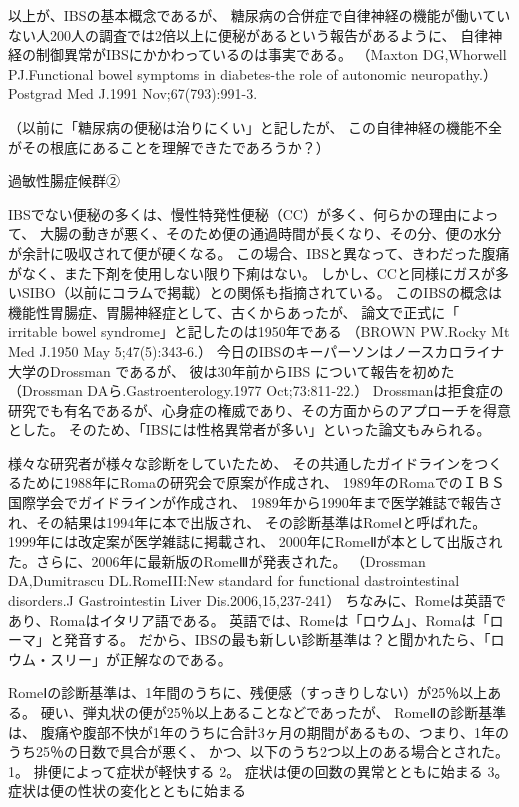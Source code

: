 以上が、IBSの基本概念であるが、
糖尿病の合併症で自律神経の機能が働いていない人200人の調査では2倍以上に便秘があるという報告があるように、
自律神経の制御異常がIBSにかかわっているのは事実である。
（Maxton DG,Whorwell PJ.Functional bowel symptoms in diabetes-the role of autonomic neuropathy.） 
Postgrad Med J.1991 Nov;67(793):991-3.

（以前に「糖尿病の便秘は治りにくい」と記したが、
この自律神経の機能不全がその根底にあることを理解できたであろうか？） 


過敏性腸症候群②

IBSでない便秘の多くは、慢性特発性便秘（CC）が多く、何らかの理由によって、
大腸の動きが悪く、そのため便の通過時間が長くなり、その分、便の水分が余計に吸収されて便が硬くなる。
この場合、IBSと異なって、きわだった腹痛がなく、また下剤を使用しない限り下痢はない。
しかし、CCと同様にガスが多いSIBO（以前にコラムで掲載）との関係も指摘されている。 
このIBSの概念は機能性胃腸症、胃腸神経症として、古くからあったが、
論文で正式に「 irritable bowel syndrome」と記したのは1950年である
（BROWN PW.Rocky Mt Med J.1950 May 5;47(5):343-6.） 
今日のIBSのキーパーソンはノースカロライナ大学のDrossman であるが、
彼は30年前からIBS について報告を初めた（Drossman DAら.Gastroenterology.1977 Oct;73:811-22.）
Drossmanは拒食症の研究でも有名であるが、心身症の権威であり、その方面からのアプローチを得意とした。
そのため、「IBSには性格異常者が多い」といった論文もみられる。 

様々な研究者が様々な診断をしていたため、
その共通したガイドラインをつくるために1988年にRomaの研究会で原案が作成され、 
1989年のRomaでのＩＢＳ国際学会でガイドラインが作成され、
1989年から1990年まで医学雑誌で報告され、その結果は1994年に本で出版され、
その診断基準はRomeⅠと呼ばれた。1999年には改定案が医学雑誌に掲載され、
2000年にRomeⅡが本として出版された。さらに、2006年に最新版のRomeⅢが発表された。 
（Drossman DA,Dumitrascu DL.RomeIII:New standard for functional dastrointestinal disorders.J Gastrointestin Liver Dis.2006,15,237-241） 
ちなみに、Romeは英語であり、Romaはイタリア語である。
英語では、Romeは「ロウム」、Romaは「ローマ」と発音する。
だから、IBSの最も新しい診断基準は？と聞かれたら、「ロウム・スリー」が正解なのである。 

RomeⅠの診断基準は、1年間のうちに、残便感（すっきりしない）が25％以上ある。
硬い、弾丸状の便が25％以上あることなどであったが、 
RomeⅡの診断基準は、
腹痛や腹部不快が1年のうちに合計3ヶ月の期間があるもの、つまり、1年のうち25％の日数で具合が悪く、
かつ、以下のうち2つ以上のある場合とされた。 
1。 排便によって症状が軽快する 
2。 症状は便の回数の異常とともに始まる
3。 症状は便の性状の変化とともに始まる

